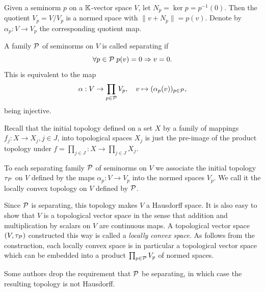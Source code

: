 \begin{defn}
    Given a seminorm $p$ on a $\mathbb{K}$-vector space $V$, let $N_p=\ker p=p^{-1}(0)$. Then the quotient $V_p=V\slash V_p$ is a normed space with $\lVert v+N_p\rVert=p(v)$. Denote by $\alpha_p:V\to V_p$ the corresponding quotient map.

    A family $\mathcal{P}$ of seminorms on $V$ is called separating if 
    \[\forall p\in \mathcal{P} \; p(v)=0 \Rightarrow v=0.\]
    This is equivalent to the map
    \[\alpha:V\to \prod_{p\in\mathcal{P}}V_p,\quad v\mapsto (\alpha_p(v))_{p\in \mathcal{P}},\]
    being injective.
\end{defn}

\begin{defn}
    Recall that the initial topology defined on a set $X$ by a family of mappings $f_j:X\to X_j, j\in J$, into topological spaces $X_j$ is just the pre-image of the product topology under $f=\prod_{j\in J}:X\to \prod_{j\in J}X_j$.

    To each separating family $\mathcal{P}$ of seminorms on $V$ we associate the initial topology $\tau_{\mathcal{P}}$ on $V$ defined by the maps $\alpha_p:V\to V_p$ into the normed spaces $V_p$. We call it the locally convex topology on $V$ defined by $\mathcal{P}$.

    Since $\mathcal{P}$ is separating, this topology makes $V$ a Hausdorff space. It is also easy to show that $V$ is a topological vector space in the sense that addition and multiplication by scalars on $V$ are continuous maps. A topological vector space $(V,\tau_{\mathcal{P}})$ constructed this way is called a \emph{locally convex space}. As follows from the construction, each locally convex space is in particular a topological vector space which can be embedded into a product $\prod_{p\in \mathcal{P}}V_p$ of normed spaces.
\end{defn}

\begin{defn}
    Some authors drop the requirement that $\mathcal{P}$ be separating, in which case the resulting topology is not Hausdorff.
\end{defn}

